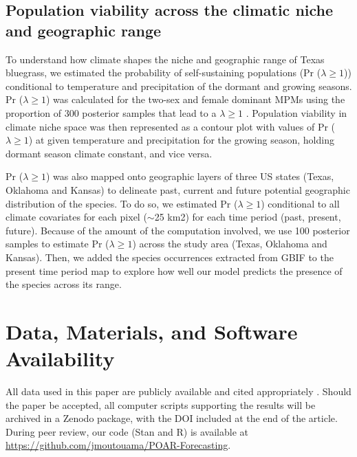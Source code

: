 \documentclass[9pt,twocolumn,twoside,lineno]{pnas-new}
\newcommand{\tom}[2]{{\color{red}{#1}}\footnote{\textit{\color{red}{#2}}}}
\begin{document}
\subsection*{Population viability across the climatic niche and geographic range}
To understand how climate shapes the niche and geographic range of Texas bluegrass, we estimated the probability of self-sustaining populations (Pr ($\lambda \ge 1$)) conditional to temperature and precipitation of the dormant and growing seasons.
Pr ($\lambda \ge 1$) was calculated for the two-sex and female dominant MPMs using the proportion of 300 posterior samples that lead to a $\lambda \ge 1$ \citep{diez2014probabilistic}.
Population viability in climate niche space was then represented as a contour plot with values of Pr ($\lambda \ge 1$) at given temperature and precipitation for the growing season, holding dormant season climate constant, and vice versa. 

Pr ($\lambda \ge 1$) was also mapped onto geographic layers of three US states (Texas, Oklahoma and Kansas) to delineate past, current and future potential geographic distribution of the species.
To do so, we estimated Pr ($\lambda \ge 1$) conditional to all climate covariates for each pixel ($\sim$25 km2) for each time period (past, present, future).
Because of the amount of the computation involved, we use 100 posterior samples to estimate Pr ($\lambda \ge 1$) across the study area (Texas, Oklahoma and Kansas).
Then, we added the species occurrences extracted from GBIF to the present time period map to explore how well our model predicts the presence of the species across its range.


\showmatmethods{} %

\section*{Data, Materials, and Software Availability}
All data used in this paper are  publicly available and cited appropriately \citep{dryaddata, https://doi.org/10.15468/dl.j6n7ck}. 
Should the paper be accepted, all computer scripts supporting the results will be archived in a Zenodo package, with the DOI included at the end of the article. 
During peer review, our code (Stan and R) is available at \url{https://github.com/jmoutouama/POAR-Forecasting}. 
\end{document}
